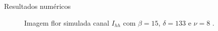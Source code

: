 \documentclass[10pt]{beamer}
\begin{document}
\begin{frame}{Resultados numéricos}
\begin{figure}[hbt]
	\caption{Imagem flor simulada canal $I_{hh}$ com $\beta = 15$, $\delta = 133$ e $\nu = 8$ .}
\endminipage\hfill
{}

\end{figure}
\end{frame}
\end{document}
